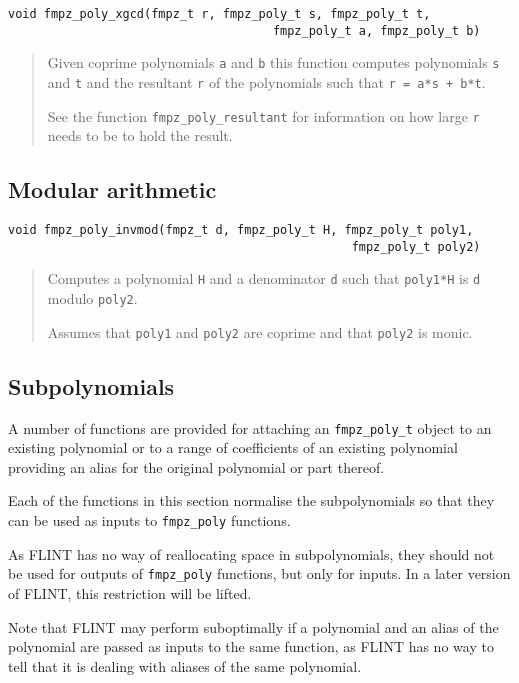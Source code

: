 \documentclass[a4paper,10pt]{article}
\newcommand{\code}{\lstinline}
\begin{document}
\begin{lstlisting}
void fmpz_poly_xgcd(fmpz_t r, fmpz_poly_t s, fmpz_poly_t t, 
                                     fmpz_poly_t a, fmpz_poly_t b)
\end{lstlisting}
\begin{quote}
Given coprime polynomials \code{a} and \code{b} this function computes polynomials \code{s} and \code{t} and the resultant \code{r} of the polynomials such that \code{r = a*s + b*t}.

See the function \code{fmpz_poly_resultant} for information on how large \code{r} needs to be to hold the result.
\end{quote}

\subsection{Modular arithmetic}
\begin{lstlisting}
void fmpz_poly_invmod(fmpz_t d, fmpz_poly_t H, fmpz_poly_t poly1, 
                                                fmpz_poly_t poly2)
\end{lstlisting}
\begin{quote}
Computes a polynomial \code{H} and a denominator \code{d} such that \code{poly1*H} is \code{d} modulo \code{poly2}. 

Assumes that \code{poly1} and \code{poly2} are coprime and that \code{poly2} is monic.
\end{quote}

\subsection{Subpolynomials}
A number of functions are provided for attaching an \code{fmpz_poly_t} object to an existing polynomial or to a range of coefficients of an existing polynomial providing an alias for the original polynomial or part thereof. 

Each of the functions in this section normalise the subpolynomials so that they can be used as inputs to \code{fmpz_poly} functions. 

As FLINT has no way of reallocating space in subpolynomials, they should not be used for outputs of \code{fmpz_poly} functions, but only for inputs. In a later version of FLINT, this restriction will be lifted.

Note that FLINT may perform suboptimally if a polynomial and an alias of the polynomial are passed as inputs to the same function, as FLINT has no way to tell that it is dealing with aliases of the same polynomial.
\end{document}
